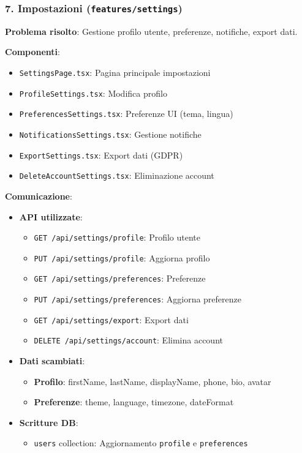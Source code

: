 \documentclass[11pt,a4paper]{article}
\begin{document}
\subsubsection{7. Impostazioni (\texttt{features/settings})}

\textbf{Problema risolto}: Gestione profilo utente, preferenze, notifiche, export dati.

\textbf{Componenti}:
\begin{itemize}
    \item \texttt{SettingsPage.tsx}: Pagina principale impostazioni
    \item \texttt{ProfileSettings.tsx}: Modifica profilo
    \item \texttt{PreferencesSettings.tsx}: Preferenze UI (tema, lingua)
    \item \texttt{NotificationsSettings.tsx}: Gestione notifiche
    \item \texttt{ExportSettings.tsx}: Export dati (GDPR)
    \item \texttt{DeleteAccountSettings.tsx}: Eliminazione account
\end{itemize}

\textbf{Comunicazione}:
\begin{itemize}
    \item \textbf{API utilizzate}: 
    \begin{itemize}
        \item \texttt{GET /api/settings/profile}: Profilo utente
        \item \texttt{PUT /api/settings/profile}: Aggiorna profilo
        \item \texttt{GET /api/settings/preferences}: Preferenze
        \item \texttt{PUT /api/settings/preferences}: Aggiorna preferenze
        \item \texttt{GET /api/settings/export}: Export dati
        \item \texttt{DELETE /api/settings/account}: Elimina account
    \end{itemize}
    \item \textbf{Dati scambiati}: 
    \begin{itemize}
        \item \textbf{Profilo}: firstName, lastName, displayName, phone, bio, avatar
        \item \textbf{Preferenze}: theme, language, timezone, dateFormat
    \end{itemize}
    \item \textbf{Scritture DB}: 
    \begin{itemize}
        \item \texttt{users} collection: Aggiornamento \texttt{profile} e \texttt{preferences}
    \end{itemize}
\end{itemize}
\end{document}

